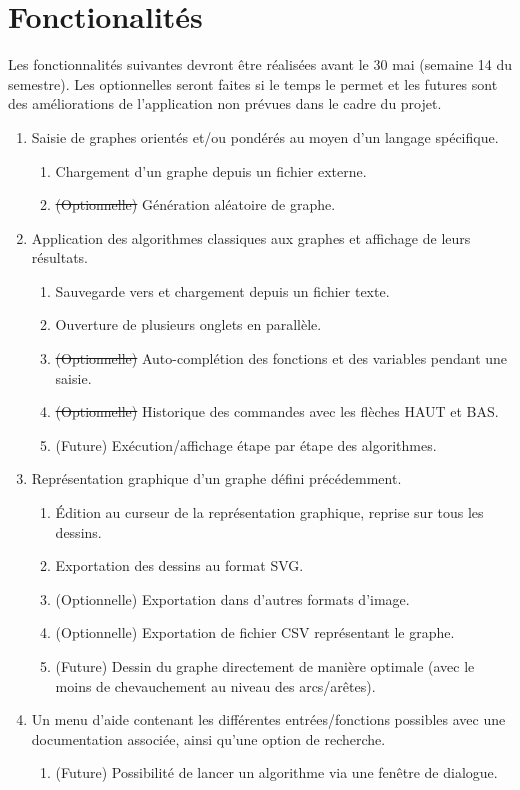 \documentclass[french]{article}
\begin{document}
	\section{Fonctionalités}
		Les fonctionnalités suivantes devront être réalisées avant le 30 mai (semaine 14 du semestre). Les optionnelles seront faites si le temps le permet et les futures sont des améliorations de l'application non prévues dans le cadre du projet.
		\begin{enumerate}
			\item Saisie de graphes orientés et/ou pondérés au moyen d'un langage spécifique.
			\begin{enumerate}
				\item Chargement d'un graphe depuis un fichier externe.
				\item \sout{(Optionnelle)} Génération aléatoire de graphe.
			\end{enumerate}
			
			\item Application des algorithmes classiques aux graphes et affichage de leurs résultats.
			\begin{enumerate}
				\item Sauvegarde vers et chargement depuis un fichier texte.
				\item Ouverture de plusieurs onglets en parallèle.
				\item \sout{(Optionnelle)} Auto-complétion des fonctions et des variables pendant une saisie.
				\item \sout{(Optionnelle)} Historique des commandes avec les flèches HAUT et BAS.
				\item (Future) Exécution/affichage étape par étape des algorithmes.
			\end{enumerate}
			
			\item Représentation graphique d'un graphe défini précédemment.
			\begin{enumerate}
				\item Édition au curseur de la représentation graphique, reprise sur tous les dessins.
				\item Exportation des dessins au format SVG.
				\item (Optionnelle) Exportation dans d'autres formats d'image.
				\item (Optionnelle) Exportation de fichier CSV représentant le graphe.
				\item (Future) Dessin du graphe directement de manière optimale (avec le moins de chevauchement au niveau des arcs/arêtes).
			\end{enumerate}
			
			\item Un menu d'aide contenant les différentes entrées/fonctions possibles avec une documentation associée, ainsi qu'une option de recherche.
			\begin{enumerate}
				\item (Future) Possibilité de lancer un algorithme via une fenêtre de dialogue.
			\end{enumerate}
		\end{enumerate}
		
\end{document}
